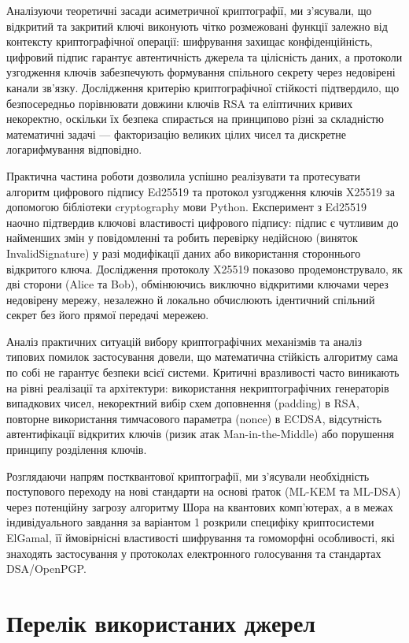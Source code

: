 \documentclass[12pt,a4paper]{article}
\begin{document}
Аналізуючи теоретичні засади асиметричної криптографії, ми з'ясували, що відкритий та закритий ключі
виконують чітко розмежовані функції залежно від контексту криптографічної операції: шифрування захищає
конфіденційність, цифровий підпис гарантує автентичність джерела та цілісність даних, а протоколи
узгодження ключів забезпечують формування спільного секрету через недовірені канали зв'язку.
Дослідження критерію криптографічної стійкості підтвердило, що безпосередньо порівнювати довжини
ключів RSA та еліптичних кривих некоректно, оскільки їх безпека спирається на принципово різні за
складністю математичні задачі --- факторизацію великих цілих чисел та дискретне логарифмування
відповідно.

Практична частина роботи дозволила успішно реалізувати та протесувати алгоритм цифрового підпису
Ed25519 та протокол узгодження ключів X25519 за допомогою бібліотеки cryptography мови Python.
Експеримент з Ed25519 наочно підтвердив ключові властивості цифрового підпису: підпис є чутливим до
найменших змін у повідомленні та робить перевірку недійсною (виняток InvalidSignature) у разі модифікації
даних або використання стороннього відкритого ключа. Дослідження протоколу X25519 показово
продемонструвало, як дві сторони (Alice та Bob), обмінюючись виключно відкритими ключами через
недовірену мережу, незалежно й локально обчислюють ідентичний спільний секрет без його прямої передачі
мережею.

Аналіз практичних ситуацій вибору криптографічних механізмів та аналіз типових помилок застосування
довели, що математична стійкість алгоритму сама по собі не гарантує безпеки всієї системи. Критичні
вразливості часто виникають на рівні реалізації та архітектури: використання некриптографічних генераторів
випадкових чисел, некоректний вибір схем доповнення (padding) в RSA, повторне використання тимчасового
параметра (nonce) в ECDSA, відсутність автентифікації відкритих ключів (ризик атак Man-in-the-Middle) або
порушення принципу розділення ключів.

Розглядаючи напрям постквантової криптографії, ми з'ясували необхідність поступового переходу на нові
стандарти на основі ґраток (ML-KEM та ML-DSA) через потенційну загрозу алгоритму Шора на квантових
комп'ютерах, а в межах індивідуального завдання за варіантом 1 розкрили специфіку криптосистеми ElGamal,
її ймовірнісні властивості шифрування та гомоморфні особливості, які знаходять застосування у протоколах
електронного голосування та стандартах DSA/OpenPGP.


\section*{Перелік використаних джерел}
\end{document}
